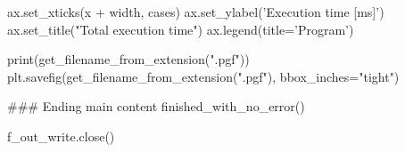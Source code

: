 ax.set_xticks(x + width, cases)
ax.set_ylabel('Execution time [ms]')
ax.set_title("Total execution time")
ax.legend(title='Program')

print(get_filename_from_extension(".pgf"))
plt.savefig(get_filename_from_extension(".pgf"), bbox_inches="tight")




### Ending main content
finished_with_no_error()


f_out_write.close()




